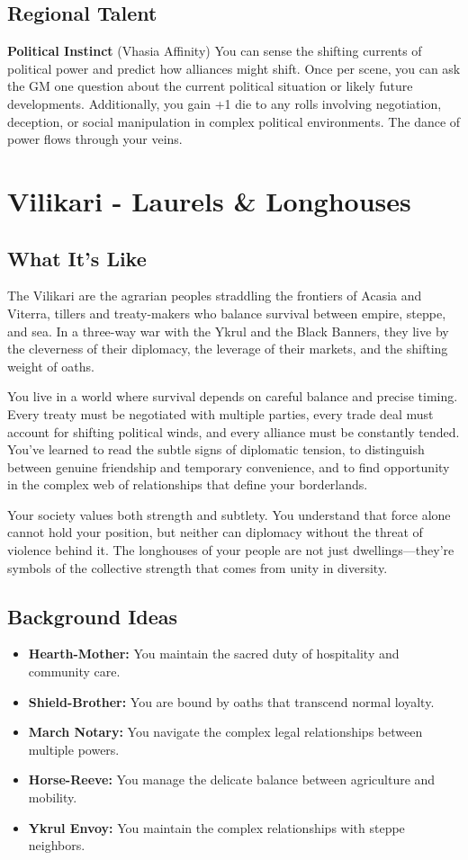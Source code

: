 \documentclass[11pt]{article}
\newcommand{\region}[1]{\section*{#1}}
\newcommand{\subregion}[1]{\subsection*{#1}}
\begin{document}
\begin{multicols}{2}
\subregion{Regional Talent}

\textbf{Political Instinct} (Vhasia Affinity)
You can sense the shifting currents of political power and predict how alliances might shift. Once per scene, you can ask the GM one question about the current political situation or likely future developments. Additionally, you gain +1 die to any rolls involving negotiation, deception, or social manipulation in complex political environments. The dance of power flows through your veins.

\end{multicols}

\region{Vilikari - Laurels \& Longhouses}

\begin{multicols}{2}
\subregion{What It's Like}

The Vilikari are the agrarian peoples straddling the frontiers of Acasia and Viterra, tillers and treaty-makers who balance survival between empire, steppe, and sea. In a three-way war with the Ykrul and the Black Banners, they live by the cleverness of their diplomacy, the leverage of their markets, and the shifting weight of oaths.

You live in a world where survival depends on careful balance and precise timing. Every treaty must be negotiated with multiple parties, every trade deal must account for shifting political winds, and every alliance must be constantly tended. You've learned to read the subtle signs of diplomatic tension, to distinguish between genuine friendship and temporary convenience, and to find opportunity in the complex web of relationships that define your borderlands.

Your society values both strength and subtlety. You understand that force alone cannot hold your position, but neither can diplomacy without the threat of violence behind it. The longhouses of your people are not just dwellings—they're symbols of the collective strength that comes from unity in diversity.

\columnbreak

\subregion{Background Ideas}

\begin{itemize}[leftmargin=*]
    \item \textbf{Hearth-Mother:} You maintain the sacred duty of hospitality and community care.
    \item \textbf{Shield-Brother:} You are bound by oaths that transcend normal loyalty.
    \item \textbf{March Notary:} You navigate the complex legal relationships between multiple powers.
    \item \textbf{Horse-Reeve:} You manage the delicate balance between agriculture and mobility.
    \item \textbf{Ykrul Envoy:} You maintain the complex relationships with steppe neighbors.
\end{itemize}


\end{multicols}
\end{document}
